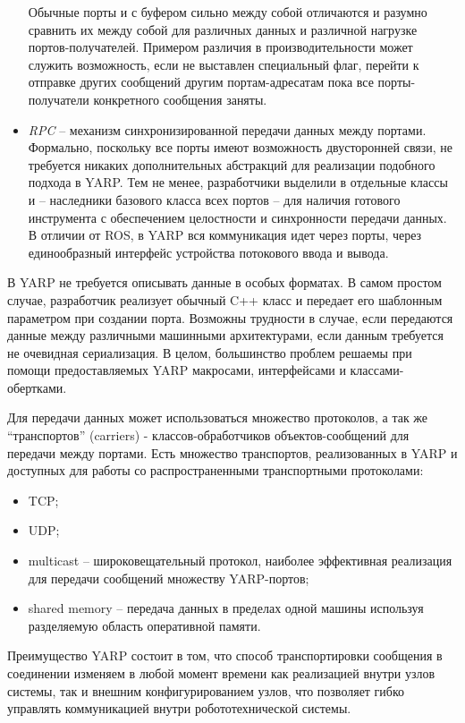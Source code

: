 \begin{itemize}
	Обычные порты  и с буфером  сильно между собой отличаются и разумно сравнить их между собой для различных данных и различной нагрузке портов-получателей. Примером различия в производительности может служить возможность, если не выставлен специальный флаг, перейти к отправке других сообщений другим портам-адресатам пока все порты-получатели конкретного сообщения заняты.
	
	\item \textit{RPC} -- механизм синхронизированной передачи данных между портами. Формально, поскольку все порты имеют возможность двусторонней связи, не требуется никаких дополнительных абстракций для реализации подобного подхода в YARP. Тем не менее, разработчики выделили в отдельные классы  и  -- наследники базового класса всех портов  -- для наличия готового инструмента с обеспечением целостности и синхронности передачи данных. В отличии от ROS, в YARP вся коммуникация идет через порты, через единообразный интерфейс устройства потокового ввода и вывода. 
\end{itemize}

В YARP не требуется описывать данные в особых форматах. В самом простом случае, разработчик реализует обычный C++ класс и передает его шаблонным параметром при создании порта. Возможны трудности в случае, если передаются данные между различными машинными архитектурами, если данным требуется не очевидная сериализация. В целом, большинство проблем решаемы при помощи предоставляемых YARP макросами, интерфейсами и классами-обертками.

Для передачи данных может использоваться множество протоколов, а так же \enquote{транспортов} (carriers) - классов-обработчиков объектов-сообщений для передачи между портами. Есть множество транспортов, реализованных в YARP и доступных для работы со распространенными транспортными протоколами:
\begin{itemize}[noitemsep]
	\item TCP;
	\item UDP;
	\item multicast -- широковещательный протокол, наиболее эффективная реализация для передачи сообщений множеству YARP-портов;
	\item shared memory -- передача данных в пределах одной машины используя разделяемую область оперативной памяти.
\end{itemize}
Преимущество YARP состоит в том, что способ транспортировки сообщения в соединении изменяем в любой момент времени как реализацией внутри узлов системы, так и внешним конфигурированием узлов, что позволяет гибко управлять коммуникацией внутри робототехнической системы.

